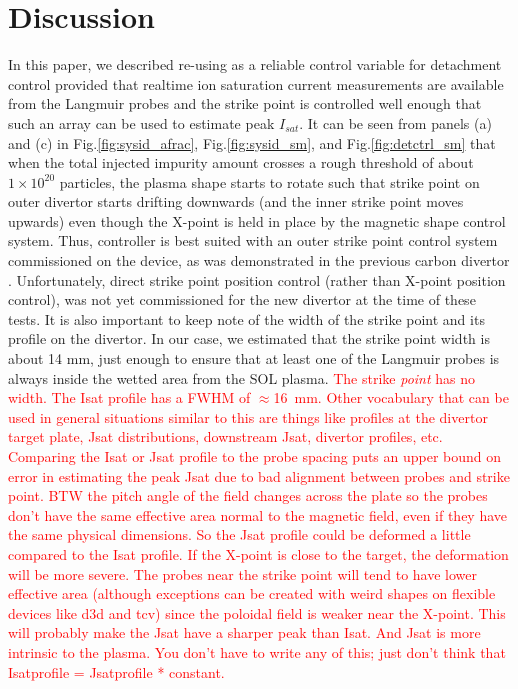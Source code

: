 \section{Discussion}
\label{sec:discussion}

In this paper, we described re-using \Afrac as a reliable control variable for detachment control provided that realtime ion saturation current measurements are available from the Langmuir probes and the strike point is controlled well enough that such an array can be used to estimate peak $I_{sat}$.
It can be seen from panels (a) and (c) in Fig.\ref{fig:sysid_afrac}, Fig.\ref{fig:sysid_sm}, and Fig.\ref{fig:detctrl_sm} that when the total injected impurity amount crosses a rough threshold of about $1\times10^{20}$ particles, the plasma shape starts to rotate such that strike point on outer divertor starts drifting downwards (and the inner strike point moves upwards) even though the X-point is held in place by the magnetic shape control system.
Thus, \Afrac controller is best suited with an outer strike point control system commissioned on the device, as was demonstrated in the previous carbon divertor \cite{Eldon_2022_PPCF}.
Unfortunately, direct strike point position control (rather than X-point position control), was not yet commissioned for the new divertor at the time of these tests.
It is also important to keep note of the width of the strike point and its profile on the divertor.
In our case, we estimated that the strike point width is about 14 mm, just enough to ensure that at least one of the Langmuir probes is always inside the wetted area from the \ac{SOL} plasma.
\textcolor{red}{The strike \emph{point} has no width. The Isat profile has a FWHM of $\approx$16~mm. Other vocabulary that can be used in general situations similar to this are things like profiles at the divertor target plate, Jsat distributions, downstream Jsat, divertor profiles, etc. Comparing the Isat or Jsat profile to the probe spacing puts an upper bound on error in estimating the peak Jsat due to bad alignment between probes and strike point. BTW the pitch angle of the field changes across the plate so the probes don't have the same effective area normal to the magnetic field, even if they have the same physical dimensions. So the Jsat profile could be deformed a little compared to the Isat profile. If the X-point is close to the target, the deformation will be more severe. The probes near the strike point will tend to have lower effective area (although exceptions can be created with weird shapes on flexible devices like d3d and tcv) since the poloidal field is weaker near the X-point. This will probably make the Jsat have a sharper peak than Isat. And Jsat is more intrinsic to the plasma. You don't have to write any of this; just don't think that Isatprofile = Jsatprofile * constant.}
